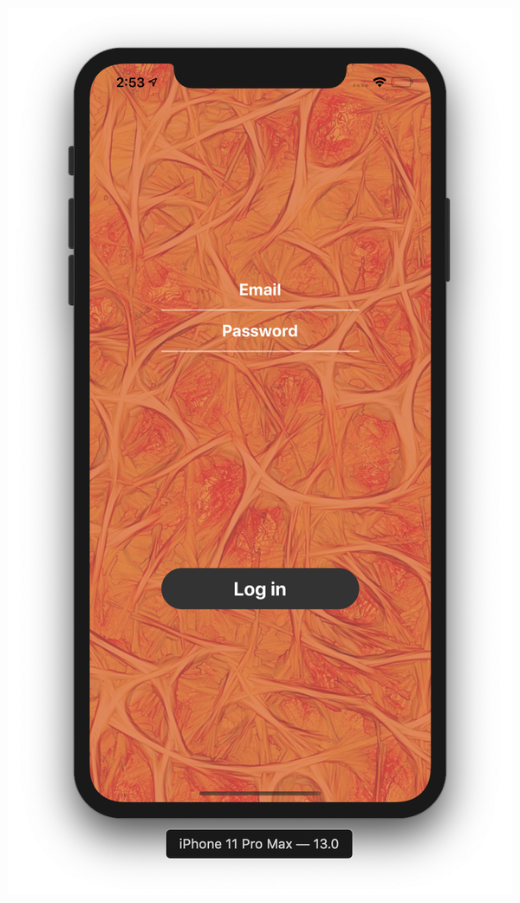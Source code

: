 \documentclass{article}
\begin{document}
\begin{center}
  \includegraphics[scale=0.2]{loginIOS.png}

\end{center}
\end{document}
